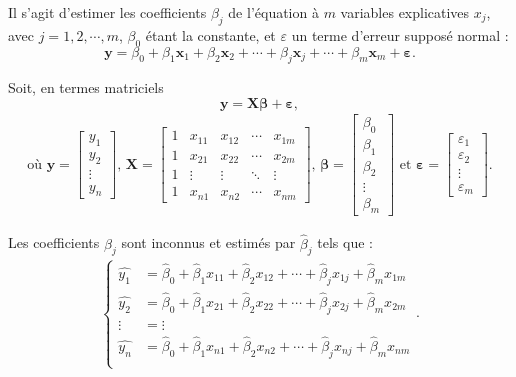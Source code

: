 \documentclass[
  11pt,
]{book}
\numberwithin{equation}{section}
\numberwithin{countremarque}{section}
\begin{document}
Il s'agit d'estimer les coefficients \(\beta_j\) de l'équation à \(m\) variables explicatives \(x_j\), avec \(j=1,2,\cdots, m\), \(\beta_0\) étant la constante, et \(\varepsilon\) un terme d'erreur supposé normal :
\begin{equation}
\boldsymbol y = \beta_0 + \beta_1 \boldsymbol x_1 + \beta_2 \boldsymbol x_2 + \cdots + \beta_j \boldsymbol x_j + \cdots + \beta_m \boldsymbol x_m  + \boldsymbol \varepsilon.\label{eq:chap_5_reg_mult}
\end{equation}

Soit, en termes matriciels
\begin{equation}
  \boldsymbol y = \boldsymbol X \boldsymbol \beta + \boldsymbol \varepsilon,\label{eq:chap_5_reg_mult_mat}
\end{equation}
\begin{align*}
  \textrm{où } \boldsymbol y = \begin{bmatrix}
        y_1 \\ y_2 \\ \vdots \\ y_n
    \end{bmatrix}, \, \boldsymbol X = \begin{bmatrix}
      1 & x_{11} & x_{12} & \cdots & x_{1m} \\
      1 & x_{21} & x_{22} & \cdots & x_{2m} \\
      1 & \vdots  & \vdots  & \ddots & \vdots \\
      1 & x_{n1} & x_{n2} & \cdots & x_{nm}
 \end{bmatrix}, \, \boldsymbol \beta =  \begin{bmatrix}
    \beta_0\\
    \beta_1\\
  \beta_2\\
    \vdots\\
    \beta_m
 \end{bmatrix} \textrm{ et } \boldsymbol \varepsilon = \begin{bmatrix}
   \varepsilon_1\\
   \varepsilon_2\\
    \vdots\\
    \varepsilon_m
 \end{bmatrix}.
\end{align*}

Les coefficients \(\beta_j\) sont inconnus et estimés par \(\hat{\beta}_j\) tels que :
\begin{align*}
  \begin{cases}
    \hat{y_1} &  = \hat{\beta}_{0} +\hat{\beta}_1 x_{11} + \hat{\beta}_2 x_{12} + \cdots + \hat{\beta}_j x_{1j} + \hat{\beta}_m x_{1m}\\
        \hat{y_2} &  = \hat{\beta}_{0} + \hat{\beta}_1 x_{21} + \hat{\beta}_2 x_{22} + \cdots + \hat{\beta}_j x_{2j} + \hat{\beta}_m x_{2m}\\
        \vdots & = \vdots\\
        \hat{y_n} &  = \hat{\beta}_{0} + \hat{\beta}_1 x_{n1} + \hat{\beta}_2 x_{n2} + \cdots + \hat{\beta}_j x_{nj} + \hat{\beta}_m x_{nm}\\
    \end{cases}.
\end{align*}
\end{document}
